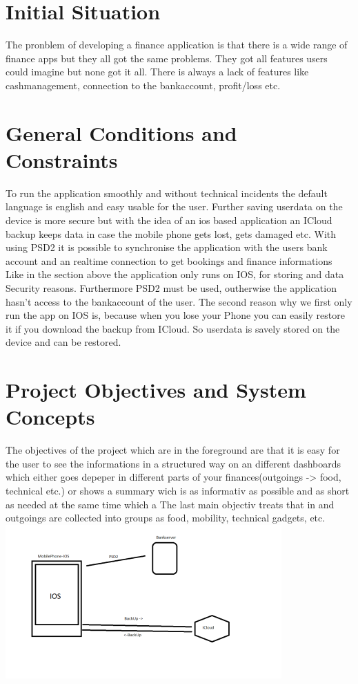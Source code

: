 \documentclass[12pt]{article}
\theoremstyle{definition}
\begin{document}
\section{Initial Situation}

The pronblem of developing a finance application is that there is a wide range of finance apps but they all got the same problems.
They got all features users could imagine but none got it all.
There is always a lack of features like cashmanagement, connection to the bankaccount, profit/loss etc.

\pagebreak

\section{General Conditions and Constraints}

To run the application smoothly and without technical incidents
the default language is english and easy usable for the user.
Further saving userdata on the device is more secure but with the idea of an ios based application an ICloud backup keeps data in case the mobile phone gets lost, gets damaged etc.
With using PSD2 it is possible to synchronise the application with the users bank account and an realtime connection to get bookings and finance informations
\\

Like in the section above the application only runs on IOS, for storing and data Security reasons. Furthermore PSD2 must be used, outherwise the application hasn't access to the bankaccount of the user.
The second reason why we first only run the app on IOS is, because when you lose your Phone you can easily restore it if you download the backup from ICloud. 
So userdata is savely stored on the device and can be restored.

\pagebreak

\section{Project Objectives and System Concepts}

The objectives of the project which are in the foreground are that 
it is easy for the user to see the informations in a structured way on an different dashboards which either goes depeper in different parts of your finances(outgoings -> food, technical etc.) or 
shows a summary wich is as informativ as possible and as short as needed at the same time which a
The last main objectiv treats that in and outgoings are collected into groups as food, mobility, technical gadgets, etc. 
\\
\includegraphics[scale=1.2]{Organisation.png}
\end{document}
